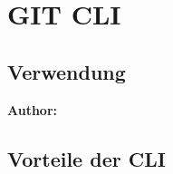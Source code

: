 \chapter{GIT CLI}
\label{cha:Einleitung}



\section{Verwendung}

\textbf{Author:} 

\section{Vorteile der CLI}

